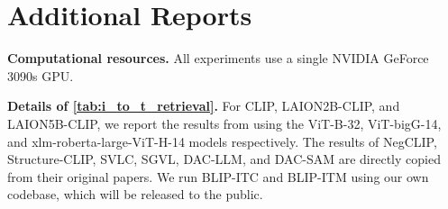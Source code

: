\documentclass{article} \usepackage{iclr2024_conference,times}
\begin{document}
\begin{table}[h]
\centering
{}
\caption{\small {\bf BLIP-2 on Winoground/EqBen.} 
}
\label{tab:blip2_other_benchmarks}
\end{table}














\section{Additional Reports}
\label{app:other}


{\bf Computational resources.} All experiments use a single NVIDIA GeForce 3090s GPU. 

{\bf Details of \autoref{tab:i_to_t_retrieval}.} For CLIP, LAION2B-CLIP, and LAION5B-CLIP, we report the results from \citet{sugarcrepe} using the ViT-B-32, ViT-bigG-14, and xlm-roberta-large-ViT-H-14 models respectively. The results of NegCLIP, Structure-CLIP, SVLC, SGVL, DAC-LLM, and DAC-SAM are directly copied from their original papers. We run BLIP-ITC and BLIP-ITM using our own codebase, which will be released to the public.
\end{document}
